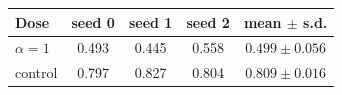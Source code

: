 \begin{tabular}{lcccc}
\toprule
Dose & seed 0 & seed 1 & seed 2 & mean $\pm$ s.d. \\
\midrule
$\alpha=1$ & 0.493 & 0.445 & 0.558 & $0.499 \pm 0.056$ \\
control & 0.797 & 0.827 & 0.804 & $0.809 \pm 0.016$ \\
\bottomrule
\end{tabular}
